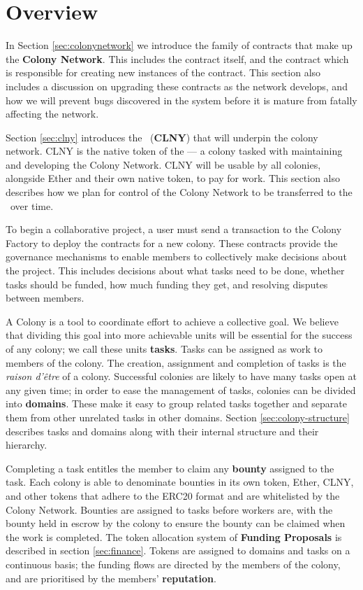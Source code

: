 \section{Overview}

In Section \ref{sec:colonynetwork} we introduce the family of contracts that make up the \textbf{Colony Network}. This includes the  contract itself, and the  contract which is responsible for creating new instances of the  contract. This section also includes a discussion on upgrading these contracts as the network develops, and how we will prevent bugs discovered in the system before it is mature from fatally affecting the network.

Section \ref{sec:clny} introduces the \rcts\ (\textbf{CLNY}) that will underpin the colony network. CLNY is the native token of the \textbf{\rc} --- a colony tasked with maintaining and developing the Colony Network. CLNY will be usable by all colonies, alongside Ether and their own native token, to pay for work. This section also describes how we plan for control of the Colony Network to be transferred to the \rc\ over time.

To begin a collaborative project, a user must send a transaction to the Colony Factory to deploy the contracts for a new colony. These contracts provide the governance mechanisms to enable members to collectively make decisions about the project. This includes decisions about what tasks need to be done, whether tasks should be funded, how much funding they get, and resolving disputes between members.

A Colony is a tool to coordinate effort to achieve a collective goal. We believe that dividing this goal into more achievable units will be essential for the success of any colony; we call these units \textbf{tasks}. Tasks can be assigned as work to members of the colony. The creation, assignment and completion of tasks is the \emph{raison d'{\^e}tre} of a colony. Successful colonies are likely to have many tasks open at any given time; in order to ease the management of tasks, colonies can be divided into \textbf{domains}. These make it easy to group related tasks together and separate them from other unrelated tasks in other domains. Section \ref{sec:colony-structure} describes tasks and domains along with their internal structure and their hierarchy.

Completing a task entitles the member to claim any \textbf{bounty} assigned to the task. Each colony is able to denominate bounties in its own token, Ether, CLNY, and other tokens that adhere to the ERC20 format \cite{erc20} and are whitelisted by the Colony Network. Bounties are assigned to tasks before workers are, with the bounty held in escrow by the colony to ensure the bounty can be claimed when the work is completed. The token allocation system of \textbf{Funding Proposals} is described in section \ref{sec:finance}. Tokens are assigned to domains and tasks on a continuous basis; the funding flows are directed by the members of the colony, and are prioritised by the members' \textbf{reputation}. 

